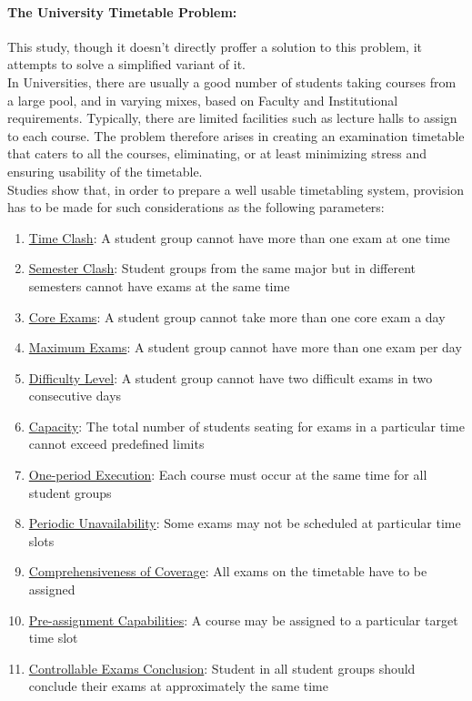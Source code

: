 \documentclass{article}
\begin{document}
			\paragraph{The University Timetable Problem:}
			This study, though it doesn't directly proffer a solution to this problem, it attempts to solve a simplified variant of it.
			\\In Universities, there are usually a good number of students taking courses from a large pool, and in varying mixes, based on Faculty and Institutional requirements. Typically, there are limited facilities such as lecture halls to assign to each course. The problem therefore arises in creating an examination timetable that caters to all the courses, eliminating, or at least minimizing stress and ensuring usability of the timetable.
			\\Studies show that, in order to prepare a well usable timetabling system, provision has to be made for such considerations as the following parameters:
			\begin{enumerate}
				\item \underline{Time Clash}: A student group cannot have more than one exam at one time
				\item \underline{Semester Clash}: Student groups from the same major but in different semesters cannot have exams at the same time
				\item \underline{Core Exams}: A student group cannot take more than one core exam a day
				\item \underline{Maximum Exams}: A student group cannot have more than one exam per day
				\item \underline{Difficulty Level}: A student group cannot have two difficult exams in two consecutive days
				\item \underline{Capacity}: The total number of students seating for exams in a particular time cannot exceed predefined limits
				\item \underline{One-period Execution}: Each course must occur at the same time for all student groups
				\item \underline{Periodic Unavailability}: Some exams may not be scheduled at particular time slots
				\item \underline{Comprehensiveness of Coverage}: All exams on the timetable have to be assigned
				\item \underline{Pre-assignment Capabilities}: A course may be assigned to a particular target time slot
				\item \underline{Controllable Exams Conclusion}: Student in all student groups should conclude their exams at approximately the same time
			\end{enumerate}
\end{document}
